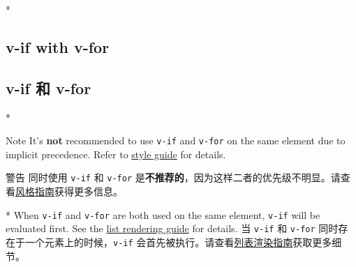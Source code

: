 \begin{paracol}{2}
\switchcolumn[0]*%
\subsection{v-if with v-for}
\switchcolumn
\subsection{v-if 和 v-for}
\switchcolumn[0]*%
\begin{vueQuoteWarn}{Note}
It's \textbf{not} recommended to use \texttt{v-if} and \texttt{v-for} on
the same element due to implicit precedence. Refer to
\href{https://vuejs.org/style-guide/rules-essential.html\#avoid-v-if-with-v-for}{style
guide} for details.    
\end{vueQuoteWarn}
\switchcolumn
\begin{vueQuoteWarn}{警告}
同时使用 \texttt{v-if} 和 \texttt{v-for}
是\textbf{不推荐的}，因为这样二者的优先级不明显。请查看\href{https://cn.vuejs.org/style-guide/rules-essential.html\#avoid-v-if-with-v-for}{风格指南}获得更多信息。
\end{vueQuoteWarn}
\switchcolumn[0]*%
When \texttt{v-if} and \texttt{v-for} are both used on the same element,
\texttt{v-if} will be evaluated first. See the
\href{https://vuejs.org/guide/essentials/list.html\#v-for-with-v-if}{list
rendering guide} for details.
\switchcolumn
当 \texttt{v-if} 和 \texttt{v-for}
同时存在于一个元素上的时候，\texttt{v-if}
会首先被执行。请查看\href{https://cn.vuejs.org/guide/essentials/list.html\#v-for-with-v-if}{列表渲染指南}获取更多细节。
\end{paracol}
